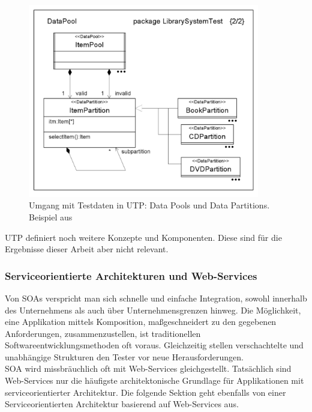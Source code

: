 \begin{figure}[h] 
  \centering
     \includegraphics[width=0.9\textwidth]{figures/utp_pool.png}
  \caption{Umgang mit Testdaten in UTP: Data Pools und Data Partitions. Beispiel aus  \cite{_model-driven_2007}}
  \label{fig:utp_pool}
\end{figure}

\Gls{UTP} definiert noch weitere Konzepte und Komponenten. Diese sind für die Ergebnisse dieser Arbeit aber nicht relevant.

\subsubsection{Serviceorientierte Architekturen und Web-Services}
Von \glspl{SOA} verspricht man sich schnelle und einfache Integration, sowohl innerhalb des Unternehmens als auch über Unternehmensgrenzen hinweg. Die Möglichkeit, eine Applikation mittels Komposition, maßgeschneidert zu den gegebenen Anforderungen, zusammenzustellen, ist traditionellen Softwareentwicklungsmethoden oft voraus. Gleichzeitig stellen verschachtelte und unabhängige Strukturen den Tester vor neue Herausforderungen. \\
SOA wird missbräuchlich oft mit Web-Services gleichgestellt. Tatsächlich sind Web-Services nur die häufigste architektonische Grundlage für Applikationen mit  serviceorientierter Architektur. Die folgende Sektion geht ebenfalls von einer Serviceorientierten Architektur basierend auf Web-Services aus.

